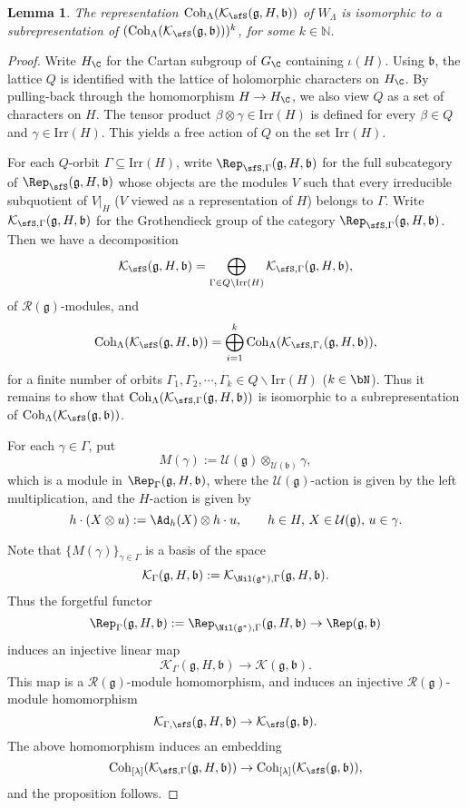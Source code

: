 \documentclass[12pt,a4paper]{amsart}
\def\subset{\subseteq}
\newcommand{\BN}{{\mathbb {N}}}
\newcommand{\CK}{{\mathcal {K}}}
\newcommand{\CU}{{\mathcal {U}}}
\newcommand{\g}{\mathfrak g}
\renewcommand{\b}{\mathfrak b}
\numberwithin{equation}{section}
\newtheorem{lem}[thm]{Lemma}
\theoremstyle{remark}
\def\Irr{\mathrm{Irr}}
\def\Coh{\mathrm{Coh}}
\newcommand{\Lam}{{[\lambda]}}
\begin{document}
 \begin{lem}\label{lem0022}
The representation $\Coh_{\Lambda}(\CK_\sfS(\g,H, \b))$ of $W_{\Lambda}$ is isomorphic to a subrepresentation of $(\Coh_{\Lambda}(\CK_\sfS(\g, \b)))^k$, for some $k\in \BN$.
     \end{lem}
\begin{proof}


Write $H_\C$ for the Cartan subgroup of $G_\C$ containing $\iota(H)$. Using $\b$,   the lattice $Q$ is identified  with the lattice of holomorphic characters on $H_\C$. By pulling-back through the homomorphism $H\rightarrow H_\C$, we also view $Q$ as a set of characters on $H$.
The tensor product $\beta\otimes \gamma\in \Irr(H)$ is defined for every $\beta\in Q$ and $\gamma\in \Irr(H)$. This yields a free action of $Q$ on the set $\Irr(H)$.

For each $Q$-orbit $\Gamma\subset \Irr(H)$, write $\Rep_{\sfS,\Gamma}(\g,H,\b)$ for the full subcategory of $\Rep_\sfS(\g,H,\b)$ whose objects are  the modules $V$ such that every irreducible subquotient of $V|_H$ ($V$ viewed as a representation of $H$) belongs to $\Gamma$. Write $\CK_{\sfS,\Gamma}(\g,H,\b)$ for the  Grothendieck group of the category $\Rep_{\sfS,\Gamma}(\g,H,\b)$.
Then  we have a decomposition
\[
\CK_\sfS(\g,H,\b)=\bigoplus_{\Gamma\in Q\backslash \Irr(H)} \CK_{\sfS,\Gamma}(\g,H,\b),
\]
of $\mathcal R(\g)$-modules, and
\[
\Coh_{\Lambda}(\CK_\sfS(\g,H, \b))=\bigoplus_{i=1}^k  \Coh_{\Lambda}(\CK_{ \sfS,\Gamma_i}(\g,H,\b)),
\]
for a finite number of orbits $\Gamma_1, \Gamma_2, \cdots, \Gamma_k\in Q\backslash \Irr(H)$ ($k\in \bN$). Thus it remains to show that $ \Coh_{\Lambda}(\CK_{ \sfS,\Gamma}(\g,H,\b))$ is isomorphic to a subrepresentation of  $\Coh_{\Lambda}(\CK_\sfS(\g, \b))$.



For each $\gamma\in \Gamma$, put
\[
  M(\gamma):=\CU(\g)\otimes_{\CU(\b)} \gamma,
\]
which is a module in $\Rep_\Gamma(\g,H,\b)$, where the $\CU(\g)$-action is given by the left multiplication, and the $H$-action is given by
\[
 h\cdot (X\otimes u):=\Ad_h(X)\otimes h \cdot u, \qquad h\in H, \, X\in \CU(\g),\, u\in \gamma.
\]

Note that $\{ M(\gamma)\}_{\gamma\in \Gamma}$ is a basis of the space %
\[
\CK_{\Gamma}(\g,H,\b):=\CK_{\Nil(\g^*),\Gamma}(\g,H,\b).
\]
Thus the forgetful functor
\[
   \Rep_{\Gamma}(\g,H,\b):=\Rep_{\Nil(\g^*),\Gamma}(\g,H,\b)\rightarrow  \Rep(\g,\b)
\]
induces an injective linear map
\[
    \CK_{\Gamma}(\g,H,\b)\rightarrow  \CK(\g,\b).
\]
This map is a $\mathcal R(\g)$-module homomorphism, and induces an injective
$\mathcal R(\g)$-module homomorphism
\[
    \CK_{\Gamma,\sfS}(\g,H,\b)\rightarrow  \CK_\sfS(\g,\b).
\]
The above homomorphism induces an embedding
\[
    \Coh_{\Lam}(\CK_{ \sfS,\Gamma}(\g,H,\b))\rightarrow  \Coh_{\Lam}(\CK_\sfS(\g,\b)),
\]
and the proposition follows.
\end{proof}
\end{document}

